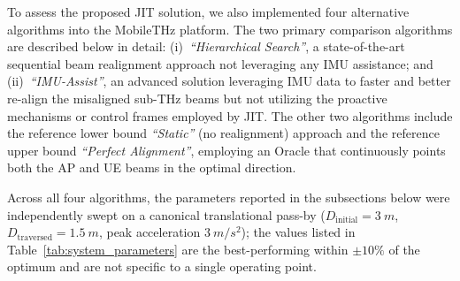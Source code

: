 \documentclass[fleqn,10pt]{wlscirep}
\newcommand{\rev}[1]{{\color{revblue}#1}}
\begin{document}
To assess the proposed JIT solution, we also implemented four alternative algorithms into the MobileTHz platform. The two primary comparison algorithms are described below in detail: (i)~\emph{``Hierarchical Search''}, a state-of-the-art sequential beam realignment approach not leveraging any IMU assistance; and (ii)~\emph{``IMU-Assist''}, an advanced solution leveraging IMU data to faster and better re-align the misaligned sub-THz beams but not utilizing the proactive mechanisms or control frames employed by JIT. The other two algorithms include the reference lower bound \emph{``Static''} (no realignment) approach and the reference upper bound \emph{``Perfect Alignment''}, employing an Oracle that continuously points both the AP and UE beams in the optimal direction.

\rev{Across all four algorithms, the parameters reported in the subsections below were independently swept on a canonical translational pass-by ($D_{\text{initial}} = \SI{3}{m}$, $D_{\text{traversed}} = \SI{1.5}{m}$, peak acceleration $\SI{3}{m/s^2}$); the values listed in Table~\ref{tab:system_parameters} are the best-performing within $\pm 10\%$ of the optimum and are not specific to a single operating point.}



\end{document}
